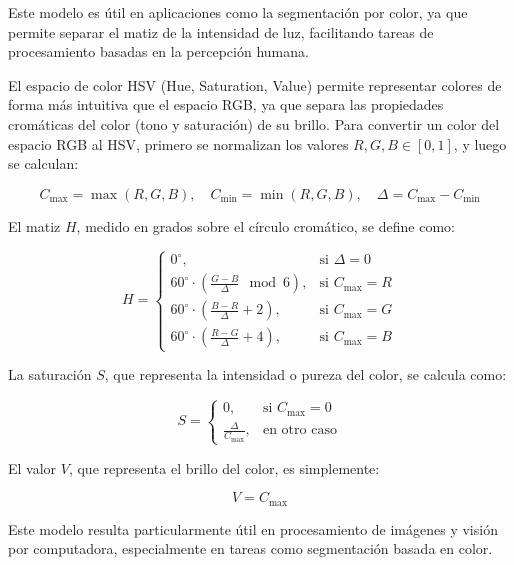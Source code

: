 \documentclass[11pt, letterpaper]{article}
\begin{document}
Este modelo es útil en aplicaciones como la segmentación por color, ya que permite separar el matiz de la intensidad de luz, facilitando tareas de procesamiento basadas en la percepción humana.

El espacio de color HSV (Hue, Saturation, Value) permite representar colores de forma más intuitiva que el espacio RGB, ya que separa las propiedades cromáticas del color (tono y saturación) de su brillo. Para convertir un color del espacio RGB al HSV, primero se normalizan los valores \( R, G, B \in [0,1] \), y luego se calculan:

\[
C_{\text{max}} = \max(R, G, B), \quad 
C_{\text{min}} = \min(R, G, B), \quad 
\Delta = C_{\text{max}} - C_{\text{min}}
\]

El matiz \( H \), medido en grados sobre el círculo cromático, se define como:

\[
H =
\begin{cases}
	0^\circ, & \text{si } \Delta = 0 \\
	60^\circ \cdot \left( \frac{G - B}{\Delta} \mod 6 \right), & \text{si } C_{\text{max}} = R \\
	60^\circ \cdot \left( \frac{B - R}{\Delta} + 2 \right), & \text{si } C_{\text{max}} = G \\
	60^\circ \cdot \left( \frac{R - G}{\Delta} + 4 \right), & \text{si } C_{\text{max}} = B
\end{cases}
\]

La saturación \( S \), que representa la intensidad o pureza del color, se calcula como:

\[
S =
\begin{cases}
	0, & \text{si } C_{\text{max}} = 0 \\
	\frac{\Delta}{C_{\text{max}}}, & \text{en otro caso}
\end{cases}
\]

El valor \( V \), que representa el brillo del color, es simplemente:

\[
V = C_{\text{max}}
\]

Este modelo resulta particularmente útil en procesamiento de imágenes y visión por computadora, especialmente en tareas como segmentación basada en color.
\end{document}
